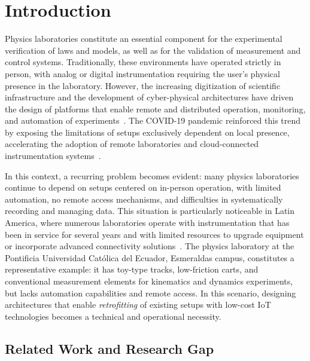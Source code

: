 \documentclass[sensors,article,submit,pdftex]{Definitions/mdpi}
\begin{document}

\section{Introduction}

Physics laboratories constitute an essential component for the experimental verification of laws and models, as well as for the validation of measurement and control systems. Traditionally, these environments have operated strictly in person, with analog or digital instrumentation requiring the user's physical presence in the laboratory. However, the increasing digitization of scientific infrastructure and the development of cyber-physical architectures have driven the design of platforms that enable remote and distributed operation, monitoring, and automation of experiments~\cite{r1}. The COVID-19 pandemic reinforced this trend by exposing the limitations of setups exclusively dependent on local presence, accelerating the adoption of remote laboratories and cloud-connected instrumentation systems~\cite{r2}.

In this context, a recurring problem becomes evident: many physics laboratories continue to depend on setups centered on in-person operation, with limited automation, no remote access mechanisms, and difficulties in systematically recording and managing data. This situation is particularly noticeable in Latin America, where numerous laboratories operate with instrumentation that has been in service for several years and with limited resources to upgrade equipment or incorporate advanced connectivity solutions~\cite{r3,r4}. The physics laboratory at the Pontificia Universidad Cat\'olica del Ecuador, Esmeraldas campus, constitutes a representative example: it has toy-type tracks, low-friction carts, and conventional measurement elements for kinematics and dynamics experiments, but lacks automation capabilities and remote access. In this scenario, designing architectures that enable \textit{retrofitting} of existing setups with low-cost IoT technologies becomes a technical and operational necessity.

\subsection{Related Work and Research Gap}
\end{document}
